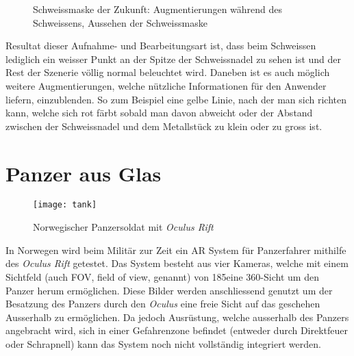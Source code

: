 \vspace{-30pt}
\begin{figure}[h]%
	\centering
	\hspace{8pt}%
	\caption[Schweissmaske der Zukunft]
	{Schweissmaske der Zukunft:
	 Augmentierungen während des Schweissens,
	 Aussehen der Schweissmaske}%
	\label{fig:weld}%
\end{figure}
\vspace{-15pt}
Resultat dieser Aufnahme- und Bearbeitungsart ist, dass beim Schweissen lediglich ein weisser Punkt an der Spitze der Schweissnadel zu sehen ist und der Rest der Szenerie völlig normal beleuchtet wird. Daneben ist es auch möglich weitere Augmentierungen, welche nützliche Informationen für den Anwender liefern, einzublenden. So zum Beispiel eine gelbe Linie, nach der man sich richten kann, welche sich rot färbt sobald man davon abweicht oder der Abstand zwischen der Schweissnadel und dem Metallstück zu klein oder zu gross ist.\cite{website:welding}

\newpage
\section{Panzer aus Glas}\label{s.tank}
\begin{wrapfigure}{r}{0.5\textwidth}
	\vspace{-25pt}
	\begin{center}
		\texttt{[image: tank]}
	\end{center}
	\vspace{-15pt}
	\captionsetup{width=0.42\textwidth}
	\caption{Norwegischer Panzersoldat mit \textit{Oculus Rift}}\label{tank}
	\vspace{-10pt}
\end{wrapfigure}
In Norwegen wird beim Militär zur Zeit ein AR System für Panzerfahrer mithilfe des \textit{Oculus Rift} getestet. Das System besteht aus vier Kameras, welche mit einem Sichtfeld (auch FOV, field of view, genannt) von 185\textdegree eine 360\textdegree-Sicht um den Panzer herum ermöglichen. Diese Bilder werden anschliessend genutzt um der Besatzung des Panzers durch den \textit{Oculus} eine freie Sicht auf das geschehen Ausserhalb zu ermöglichen. Da jedoch Ausrüstung, welche ausserhalb des Panzers angebracht wird, sich in einer Gefahrenzone befindet (entweder durch Direktfeuer oder Schrapnell) kann das System noch nicht vollständig integriert werden.\cite{website:tank}


